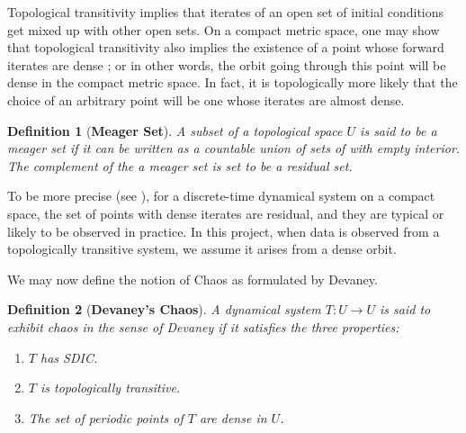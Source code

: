 \documentclass[a4paper,12pt,twoside]{report}
\newtheorem{Definition}{Definition}[]
\begin{document}
Topological transitivity implies that iterates of an open set of initial conditions get mixed up with other open sets. On a compact metric space, one may show that topological transitivity also implies the existence of a point whose forward iterates are dense \cite{de2013elements}; or in other words, the orbit going through this point will be dense in the compact metric space. 
In fact, it is topologically more likely that the choice of an arbitrary point will be one whose iterates are almost dense. 

\begin{Definition}
  [\bf {Meager Set}]\label{Dfn_Meager Set}\rm
A subset of a topological space $U$ is said to be a meager set if it can be written as a countable union of sets of with empty interior. The complement of the a meager set is set to be a residual set.
\end{Definition}

To be more precise (see \cite{de2013elements}), for a discrete-time dynamical system on a compact space, the set of points with dense iterates are residual, and they are typical or likely to be observed in practice. In this project, when data is observed from a topologically transitive system, we assume it arises from a dense orbit.

We may now define the notion of Chaos as formulated by Devaney\cite{devaney2018introduction}.
\begin{Definition}
  [\bf {Devaney's Chaos}]\label{Dfn_ChaosDec}\rm
	A dynamical system $T: U \to U$ is said to exhibit chaos in the sense of Devaney if it satisfies the three properties:
	\vspace{-5mm}
  \begin{enumerate}
		\item $T$ has SDIC.
		\item $T$ is topologically transitive.
		\item The set of periodic points of $T$ are dense in $U$. 
	\end{enumerate}
\end{Definition}
\end{document}
